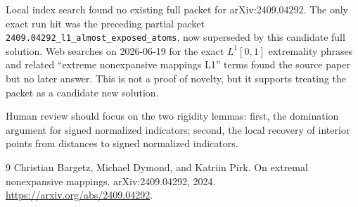 \documentclass[11pt]{article}
\begin{document}
Local index search found no existing full packet for arXiv:2409.04292. The
only exact run hit was the preceding partial packet
\texttt{2409.04292\_l1\_almost\_exposed\_atoms}, now superseded by this
candidate full solution. Web searches on 2026-06-19 for the exact
\(L^1[0,1]\) extremality phrases and related ``extreme nonexpansive mappings
L1'' terms found the source paper but no later answer. This is not a proof of
novelty, but it supports treating the packet as a candidate new solution.

Human review should focus on the two rigidity lemmas: first, the domination
argument for signed normalized indicators; second, the local recovery of
interior points from distances to signed normalized indicators.

\begin{thebibliography}{9}
Christian Bargetz, Michael Dymond, and Katriin Pirk.
\newblock On extremal nonexpansive mappings.
\newblock arXiv:2409.04292, 2024.
\newblock \url{https://arxiv.org/abs/2409.04292}.
\end{thebibliography}
\end{document}

